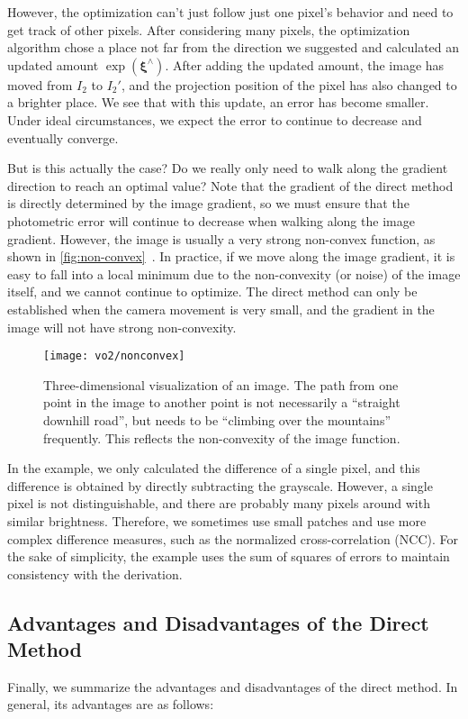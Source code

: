 However, the optimization can't just follow just one pixel's behavior and need to get track of other pixels. After considering many pixels, the optimization algorithm chose a place not far from the direction we suggested and calculated an updated amount $\exp ({\boldsymbol{\xi}^\wedge} )$. After adding the updated amount, the image has moved from $I_2$ to $I_2'$, and the projection position of the pixel has also changed to a brighter place. We see that with this update, an error has become smaller. Under ideal circumstances, we expect the error to continue to decrease and eventually converge.

But is this actually the case? Do we really only need to walk along the gradient direction to reach an optimal value? Note that the gradient of the direct method is directly determined by the image gradient, so we must ensure that the photometric error will continue to decrease when walking along the image gradient. However, the image is usually a very strong non-convex function, as shown in \autoref{fig:non-convex}~. In practice, if we move along the image gradient, it is easy to fall into a local minimum due to the non-convexity (or noise) of the image itself, and we cannot continue to optimize. The direct method can only be established when the camera movement is very small, and the gradient in the image will not have strong non-convexity.

\begin{figure}[!htp]
	\centering
	\texttt{[image: vo2/nonconvex]}
	\caption{Three-dimensional visualization of an image. The path from one point in the image to another point is not necessarily a ``straight downhill road'', but needs to be ``climbing over the mountains'' frequently. This reflects the non-convexity of the image function.}
	\label{fig:non-convex}
\end{figure}

In the example, we only calculated the difference of a single pixel, and this difference is obtained by directly subtracting the grayscale. However, a single pixel is not distinguishable, and there are probably many pixels around with similar brightness. Therefore, we sometimes use small patches and use more complex difference measures, such as the normalized cross-correlation (NCC). For the sake of simplicity, the example uses the sum of squares of errors to maintain consistency with the derivation.

\subsection{Advantages and Disadvantages of the Direct Method}
Finally, we summarize the advantages and disadvantages of the direct method. In general, its advantages are as follows:

